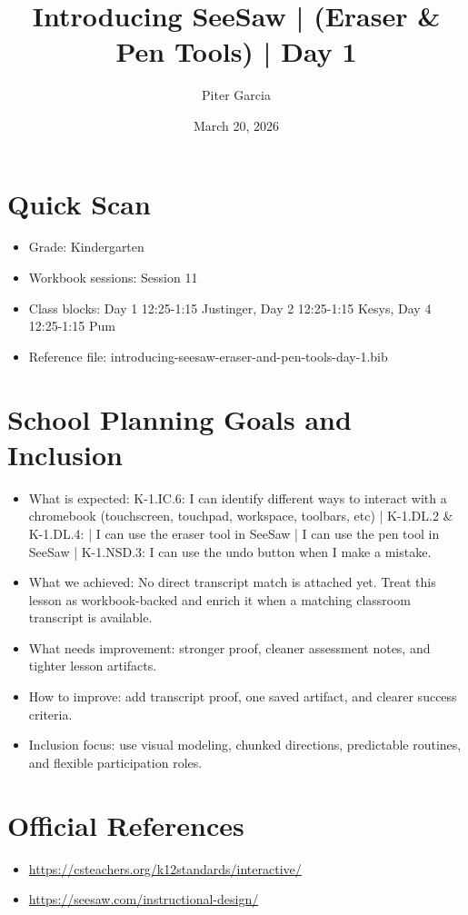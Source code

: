 \documentclass[11pt]{article}
\title{Introducing SeeSaw | (Eraser & Pen Tools) | Day 1}
\author{Piter Garcia}
\date{March 20, 2026}
\begin{document}
    \maketitle
    \section*{Quick Scan}
    \begin{itemize}[leftmargin=*]
    \item Grade: Kindergarten
    \item Workbook sessions: Session 11
    \item Class blocks: Day 1 12:25-1:15 Justinger, Day 2 12:25-1:15 Kesys, Day 4 12:25-1:15 Pum
    \item Reference file: introducing-seesaw-eraser-and-pen-tools-day-1.bib
    \end{itemize}
    \section*{School Planning Goals and Inclusion}
    \begin{itemize}[leftmargin=*]
    \item What is expected: K-1.IC.6: I can identify different ways to interact with a chromebook (touchscreen, touchpad, workspace, toolbars, etc) | K-1.DL.2 & K-1.DL.4: | I can use the eraser tool in SeeSaw | I can use the pen tool in SeeSaw | K-1.NSD.3: I can use the undo button when I make a mistake.
    \item What we achieved: No direct transcript match is attached yet. Treat this lesson as workbook-backed and enrich it when a matching classroom transcript is available.
    \item What needs improvement: stronger proof, cleaner assessment notes, and tighter lesson artifacts.
    \item How to improve: add transcript proof, one saved artifact, and clearer success criteria.
    \item Inclusion focus: use visual modeling, chunked directions, predictable routines, and flexible participation roles.
    \end{itemize}
    \section*{Official References}
    \begin{itemize}[leftmargin=*]
    \item \url{https://csteachers.org/k12standards/interactive/}
\item \url{https://seesaw.com/instructional-design/}

    \end{itemize}
    
\end{document}
